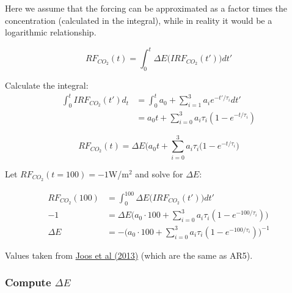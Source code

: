 \documentclass[11pt]{article}
\begin{document}
    Here we assume that the forcing can be approximated as a factor times
the concentration (calculated in the integral), while in reality it
would be a logarithmic relationship.

    \[ 
RF_{CO_2}(t) = \int_0^t \Delta E \big(IRF_{CO_2}(t'))dt'
\]

    Calculate the integral: \begin{align*}
\int_0^tIRF_{CO_2}(t')d_t & =\int_0^t a_0 + \sum_{i=1}^{3} a_i e^{-t'/\tau_i} dt'\\
& = a_0t + \sum_{i=0}^3 a_i \tau_i (1- e^{-t/\tau_i})
\end{align*}

    \[ RF_{CO_2} (t) = \Delta E \big(a_0t +  \sum_{i=0}^3a_i\tau_i (1-e^{-t/\tau_i}\big)\]

    Let \(RF_{CO_2}(t=100) = -1\)W/m\(^2\) and solve for \(\Delta E\):

    \begin{align*}
RF_{CO_2}(100) & = \int_0^{100} \Delta E \big(IRF_{CO_2}(t'))dt' \\
-1 &= \Delta E \Big(a_0\cdot 100 + \sum_{i=0}^3 a_i \tau_i (1- e^{-100/\tau_i})\Big)\\
\Delta E & = -  \Big(a_0\cdot 100 + \sum_{i=0}^3 a_i \tau_i (1- e^{-100/\tau_i})\Big)^{-1}
\end{align*}

    Values taken from
\href{https://www.atmos-chem-phys.net/13/2793/2013/acp-13-2793-2013.html}{Joos
et al (2013)} (which are the same as AR5).

    \hypertarget{compute-delta-e}{%
\subsubsection{\texorpdfstring{Compute
\(\Delta E\)}{Compute \textbackslash Delta E}}\label{compute-delta-e}}
\end{document}
